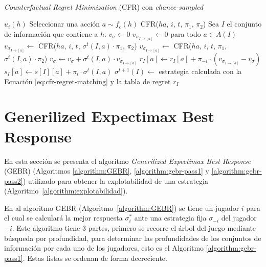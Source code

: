 \newpage
~\vspace{1.5cm}
\begin{algorithm}[H]
\caption{\textit{Counterfactual Regret Minimization} (CFR) con \textit{chance-sampled}}
\label{algorithm:CFR}
\begin{algorithmic}[1]
            \State \Return $u_i(h)$
            \State Seleccionar una acción $a \sim f_c(h)$
            \State \Return CFR($ha$, $i$, $t$, $\pi_1$, $\pi_2$)
        \EndIf
        \State Sea $I$ el conjunto de información que contiene a $h$.
        \State $v_{\sigma} \leftarrow 0$
        \State $v_{\sigma_{I \rightarrow [a]}} \leftarrow 0 $ para todo $a \in A(I)$
                \State $v_{\sigma_{I \rightarrow [a]}} \leftarrow$ CFR($ha$, $i$, $t$, $\sigma^t(I, a) \cdot \pi_1$, $\pi_2$)
                \State $v_{\sigma_{I \rightarrow [a]}} \leftarrow$ CFR($ha$, $i$, $t$, $\pi_1$, $\sigma^t(I, a) \cdot \pi_2$)
            \EndIf
            \State $v_{\sigma} \leftarrow v_{\sigma} + \sigma^t(I, a) \cdot v_{\sigma_{I \rightarrow [a]}}$
        \EndFor
                \State $r_I[a] \leftarrow r_I[a] + \pi_{-i} \cdot (v_{\sigma_{I \rightarrow [a]}} - v_{\sigma})$
                \State $s_{I}[a] \leftarrow s[I][a] + \pi_i \cdot \sigma^t(I, a)$
            \EndFor
            \State $\sigma^{t+1}(I) \leftarrow $ estrategia calculada con la Ecuación \ref{eq:cfr-regret-matching} y la tabla de regret $r_I$  
        \EndIf
    \EndFunction
\end{algorithmic}
\end{algorithm}

\newpage

\section*{Generilized Expectimax Best Response}

En esta sección se presenta el algoritmo \textit{Generilized Expectimax Best Response} (GEBR) (Algoritmos \ref{algorithm:GEBR}, \ref{algorithm:gebr-pass1} y \ref{algorithm:gebr-pass2}) utilizado para obtener la explotabilidad de una estrategia (Algoritmo~\ref{algorithm:explotabilidad}).

En al algoritmo GEBR (Algoritmo~\ref{algorithm:GEBR}) se tiene un jugador $i$ para el cual se calculará la mejor respuesta $\sigma^*_i$ ante una estrategia fija $\sigma_{-i}$ del jugador $-i$. Este algoritmo tiene $3$ partes, primero se recorre el árbol del juego mediante búsqueda por profundidad, para determinar las profundidades de los conjuntos de información por cada uno de los jugadores, esto es el Algoritmo \ref{algorithm:gebr-pass1}. Estas listas se ordenan de forma decreciente.

